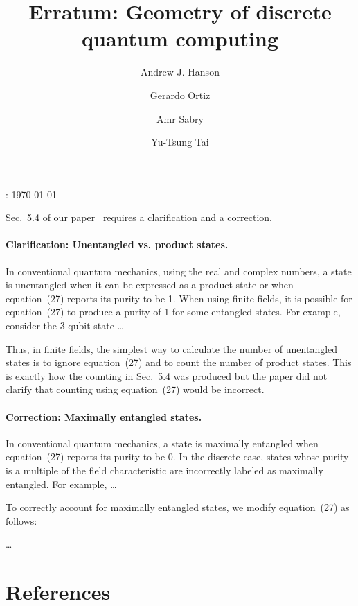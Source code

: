 \documentclass{iopart}
\begin{document}
\title{Erratum: Geometry of discrete quantum computing}


\author{Andrew J. Hanson}


\address{School of Informatics and Computing, Indiana University, Bloomington,
IN 47405, U.S.A}


\author{Gerardo Ortiz}


\address{Department of Physics, Indiana University, Bloomington, IN 47405,
U.S.A}


\author{Amr Sabry}


\address{School of Informatics and Computing, Indiana University, Bloomington,
IN 47405, U.S.A}


\author{Yu-Tsung Tai}


\address{Department of Mathematics, Indiana University, Bloomington, IN 47405,
U.S.A}


\address{School of Informatics and Computing, Indiana University, Bloomington,
IN 47405, U.S.A}


: {\today}

\maketitle

\noindent Sec.~5.4 of our paper~\cite{geometry} requires a clarification and a correction. 

\paragraph*{Clarification: Unentangled vs. product states.} In conventional quantum mechanics, using the real and complex numbers, a state is unentangled when it can be expressed as a product state or when equation~(27) reports its purity to be 1. When using finite fields, it is possible for equation~(27) to produce a purity of 1 for some entangled states. For example, consider the 3-qubit state \ldots



Thus, in finite fields, the simplest way to calculate the number of unentangled states is to ignore equation~(27) and to count the number of product states. This is exactly how the counting in Sec.~5.4 was produced but the paper did not clarify that counting using equation~(27) would be incorrect.

\paragraph*{Correction: Maximally entangled states.} In conventional quantum mechanics, a state is maximally entangled when equation~(27) reports its purity to be 0. In the discrete case, states whose purity is a multiple of the field characteristic are incorrectly labeled as maximally entangled. For example, \ldots

To correctly account for maximally entangled states, we modify equation~(27) as follows:

\ldots


\section*{References}{}



\end{document}
